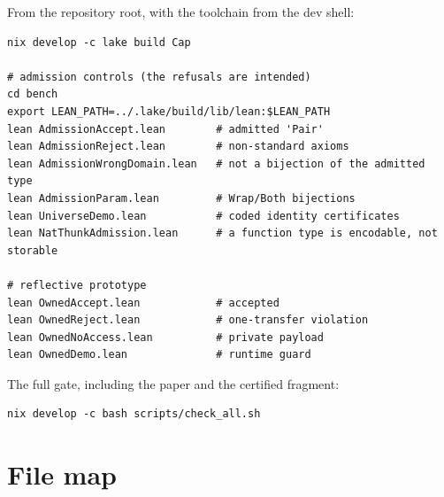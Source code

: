 \documentclass[10pt,a4paper]{article}
\begin{document}
From the repository root, with the toolchain from the dev shell:

\begin{lstlisting}[style=out]
nix develop -c lake build Cap

# admission controls (the refusals are intended)
cd bench
export LEAN_PATH=../.lake/build/lib/lean:$LEAN_PATH
lean AdmissionAccept.lean        # admitted 'Pair'
lean AdmissionReject.lean        # non-standard axioms
lean AdmissionWrongDomain.lean   # not a bijection of the admitted type
lean AdmissionParam.lean         # Wrap/Both bijections
lean UniverseDemo.lean           # coded identity certificates
lean NatThunkAdmission.lean      # a function type is encodable, not storable

# reflective prototype
lean OwnedAccept.lean            # accepted
lean OwnedReject.lean            # one-transfer violation
lean OwnedNoAccess.lean          # private payload
lean OwnedDemo.lean              # runtime guard
\end{lstlisting}

The full gate, including the paper and the certified fragment:

\begin{lstlisting}[style=out]
nix develop -c bash scripts/check_all.sh
\end{lstlisting}

\appendix
\section{File map}
\end{document}
